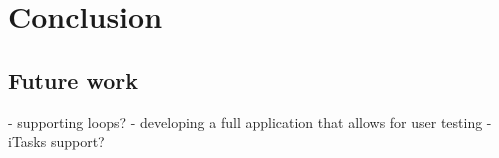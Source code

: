
\section{Conclusion}
\label{sec:conclusion}


\subsection{Future work}


- supporting loops?
- developing a full application that allows for user testing
- iTasks support?
